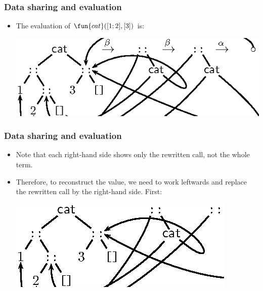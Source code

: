 \documentclass[compress,dvips,xcolor={dvipsnames},t]{beamer}
\begin{document}
\begin{frame}
  \frametitle{Data sharing and evaluation}

  \begin{itemize}

    \item The evaluation of \(\fun{cat}([1;2],[3])\) is:
      \begin{center}
        \includegraphics[bb=148 565 352 680]{cat123_push}
      \end{center}

  \end{itemize}

\end{frame}

\begin{frame}
  \frametitle{Data sharing and evaluation}

  \begin{itemize}

    \item Note that each right-hand side shows only the rewritten
      call, not the whole term.

    \item Therefore, to reconstruct the value, we need to work
      leftwards and replace the rewritten call by the right-hand
      side. First:
      \begin{center}
        \includegraphics[bb=148 570 325 661]{cat123_pop0}
      \end{center}


  \end{itemize}

\end{frame}
\end{document}
